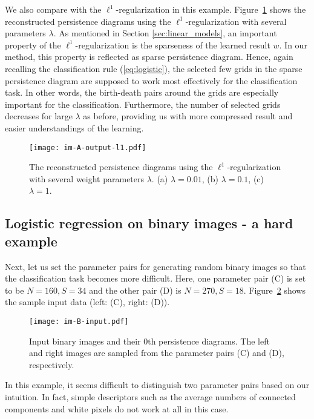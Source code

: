 \documentclass[smallextended]{svjour3}
\begin{document}
We also compare with the $\ell^1$-regularization in this example. 
Figure~\ref{fig:output_im_A_l1} shows the reconstructed persistence diagrams  using the $\ell^1$-regularization with several parameters $\lambda$.
As mentioned in Section \ref{sec:linear_models}, an important property of the $\ell^1$-regularization is the sparseness of the learned result $w$. In our method, this property is reflected as sparse persistence diagram. Hence, again recalling the classification rule (\ref{eq:logistic}), the selected few grids in the sparse persistence diagram are supposed to work most effectively for the classification task. In other words, the birth-death pairs around the grids are especially important for the classification.
Furthermore, the number of selected grids decreases for large $\lambda$ as before, providing us with more compressed result and easier understandings of the learning. 


\begin{figure}[htbp]
  \centering
  \texttt{[image: im-A-output-l1.pdf]}
  \caption{The reconstructed persistence diagrams using the $\ell^1$-regularization with several weight parameters $\lambda$.
  (a) $\lambda=0.01$, (b) $\lambda = 0.1$, (c) $\lambda = 1$.}
  \label{fig:output_im_A_l1}
\end{figure}







\subsection{Logistic regression on binary images - a hard example}
\label{sec:logreg_im_difficult}
Next, let us set the parameter pairs for generating random binary images so that the classification task becomes more difficult. Here, one parameter pair (C) is set to be $N=160, S=34$ and the other pair (D) is $N=270, S=18$. Figure~\ref{fig:input_im_B} shows the sample input data (left: (C), right: (D)).

\begin{figure}[htbp]
  \centering
  \texttt{[image: im-B-input.pdf]}
  \caption{Input binary images and their 0th persistence diagrams. The left and right images are sampled from the parameter pairs (C) and (D), respectively. }
  \label{fig:input_im_B}
\end{figure}

In this example, it seems difficult to distinguish two parameter pairs based on our intuition. In fact, simple descriptors such as 
the average numbers of connected components and white pixels do not work at all in this case. 
\end{document}
